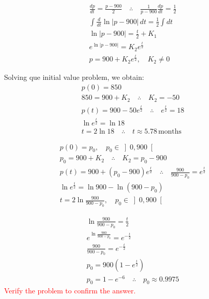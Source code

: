 \begin{solution}
	\begin{gather*}
		\frac{dp}{dt}=\frac{p-900}{2} \quad \therefore \quad \frac{1}{p-900}\frac{dp}{dt}=\frac{1}{2}\\
		\int \frac{d}{dt}\ln|p-900|\, dt=\frac{1}{2}\int dt\\
		\ln|p-900|=\frac{t}{2}+K_1\\
		e^{\ln|p-900|}=K_2e^{\frac{t}{2}}\\
		p=900+K_2e^{\frac{t}{2}}, \quad K_2 \neq 0
	\end{gather*}
	\begin{solparts}
		\item
		Solving que initial value problem, we obtain:
		\begin{gather*}
			p(0)=850\\
			850=900+K_2 \quad \therefore \quad K_2=-50\\
			p(t)=900-50e^{\frac{t}{2}} \quad \therefore \quad e^{\frac{t}{2}}=18\\
			\ln e^\frac{t}{2}=\ln 18\\
			t=2\ln 18 \quad \therefore \quad \boxed{t\approx 5.78\,\text{months}}
		\end{gather*}
		
		\item
		\begin{gather*}
			p(0)=p_0,\quad p_0 \in \left] 0,900 \right[ \\
			p_0 = 900+K_2 \quad \therefore \quad K_2=p_0-900\\
			p(t)=900+(p_0-900)e^{\frac{t}{2}}\quad \therefore \quad \frac{900}{900-p_0}=e^{\frac{t}{2}}\\
			\ln e^{\frac{t}{2}}=\ln 900 - \ln (900-p_0)\\
			\boxed{t=2\ln \frac{900}{900-p_0},\quad p_0 \in \left] 0,900 \right[}
		\end{gather*}
	
		\item 
		\begin{gather*}
			\ln \frac{900}{900-p_0}=\frac{t}{2}\\
			e^{\ln \frac{900}{900-p_0}}=e^{-\frac{t}{2}}\\
			\frac{900}{900-p_0}=e^{-\frac{t}{2}}\\
			p_0=900(1-e^{\frac{t}{2}})\\
			p_0=1-e^{-6} \quad \therefore \quad \boxed{p_0 \approx 0.9975}
		\end{gather*}
		\textcolor{red}{Verify the problem to confirm the answer.}
	\end{solparts}
\end{solution}

